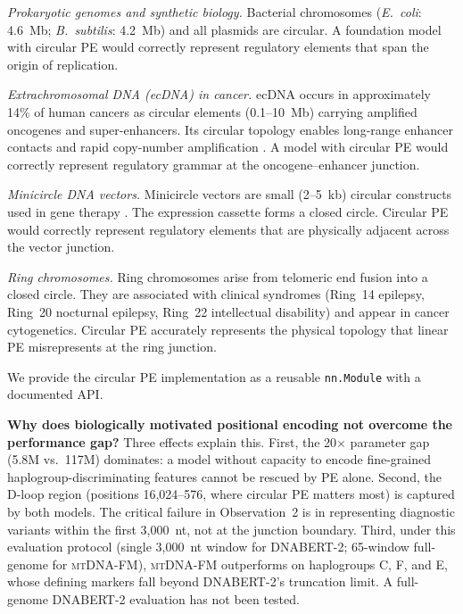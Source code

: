 \documentclass[10pt]{article}
\newcommand{\mtdnafm}{\textsc{mtDNA-FM}\xspace}
\begin{document}
\textit{Prokaryotic genomes and synthetic biology.} Bacterial chromosomes (\textit{E.~coli}:
4.6~Mb; \textit{B.~subtilis}: 4.2~Mb) and all plasmids are circular. A foundation model with
circular PE would correctly represent regulatory elements that span the origin of replication.

\textit{Extrachromosomal DNA (ecDNA) in cancer.} ecDNA occurs in approximately 14\% of human
cancers \citep{turner2017extrachromosomal} as circular elements (0.1--10~Mb) carrying amplified
oncogenes and super-enhancers. Its circular topology enables long-range enhancer contacts and
rapid copy-number amplification \citep{kim2020extrachromosomal}. A model with circular PE would
correctly represent regulatory grammar at the oncogene--enhancer junction.

\textit{Minicircle DNA vectors.} Minicircle vectors are small (2--5~kb) circular constructs used
in gene therapy \citep{kay2010minicircle}. The expression cassette forms a closed circle. Circular
PE would correctly represent regulatory elements that are physically adjacent across the vector
junction.

\textit{Ring chromosomes.} Ring chromosomes arise from telomeric end fusion into a closed circle.
They are associated with clinical syndromes (Ring~14 epilepsy, Ring~20 nocturnal epilepsy,
Ring~22 intellectual disability) \citep{guilherme2011ring} and appear in cancer cytogenetics.
Circular PE accurately represents the physical topology that linear PE misrepresents at the ring
junction.

We provide the circular PE implementation as a reusable \texttt{nn.Module} with a documented API.

\textbf{Why does biologically motivated positional encoding not overcome the performance gap?}
Three effects explain this. First, the 20$\times$ parameter gap (5.8M vs.\ 117M) dominates: a
model without capacity to encode fine-grained haplogroup-discriminating features cannot be rescued
by PE alone. Second, the D-loop region (positions 16,024--576, where circular PE matters most) is
captured by both models. The critical failure in Observation~2 is in representing diagnostic
variants within the first 3,000~nt, not at the junction boundary. Third, under this evaluation protocol (single 3,000~nt window for DNABERT-2; 65-window
full-genome for \mtdnafm{}), \mtdnafm{} outperforms on haplogroups C, F, and E, whose defining
markers fall beyond DNABERT-2's truncation limit. A full-genome DNABERT-2 evaluation has not
been tested.
\end{document}
